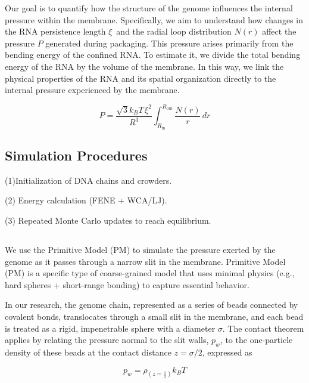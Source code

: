 \documentclass[12pt]{article}
\begin{document}
\begin{flushleft}
Our goal is to quantify how the structure of the genome influences the internal pressure within the membrane. Specifically, we aim to understand how changes in the RNA persistence length  \(\xi\)\ and the radial loop distribution \(N(r)\) affect the pressure \(P\) generated during packaging. This pressure arises primarily from the bending energy of the confined RNA. To estimate it, we divide the total bending energy of the RNA by the volume of the membrane. In this way, we link the physical properties of the RNA and its spatial organization directly to the internal pressure experienced by the membrane.   


\begin{equation}
P = \frac{\sqrt{3} k_B T \, \xi^2}{R^3} \int_{R_\text{in}}^{R_\text{out}} \frac{N(r)}{r} \, dr
\end{equation}



\subsection*{Simulation Procedures}
(1)Initialization of DNA chains and crowders.

(2) Energy calculation (FENE + WCA/LJ).

(3) Repeated Monte Carlo updates to reach equilibrium.

\subsection*{}
We use the Primitive Model (PM) to simulate the pressure exerted by the genome as it passes through a narrow slit in the membrane. Primitive Model (PM)	is a specific type of coarse-grained model that uses minimal physics (e.g., hard spheres + short-range bonding) to capture essential behavior.


 
In our research, the genome chain, represented as a series of beads connected by covalent bonds, translocates through a small slit in the membrane, and each bead is treated as a rigid, impenetrable sphere with a diameter $ \sigma $. The contact theorem\cite{Voertler1997} applies by relating the pressure normal to the slit walls, $ p_w $, to the one-particle density of these beads at the contact distance $ z = \sigma/2 $, expressed as 

\begin{equation}
p_w = \rho_{\left(z = \frac{\sigma}{2}\right)} k_B T
\end{equation}


\end{flushleft}
\end{document}

